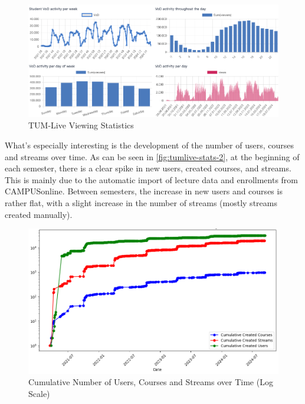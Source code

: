 \begin{figure}[htpb]
    \centering
    \includegraphics[width=\linewidth]{images/TUMLiveStatsNew.png}
    \caption[TUM-Live Statistics]{TUM-Live Viewing Statistics}\label{fig:tumlive-stats}
\end{figure}

What's especially interesting is the development of the number of users, courses and streams over time. As can be seen in \autoref{fig:tumlive-stats-2}, at the beginning of each semester, there is a clear spike in new users, created courses, and streams. This is mainly due to the automatic import of lecture data and enrollments from CAMPUSonline. Between semesters, the increase in new users and courses is rather flat, with a slight increase in the number of streams (mostly streams created manually).  

\begin{figure}[htpb]
    \centering
    \includegraphics[width=\linewidth]{images/TUMLiveStats2.png}
    \caption[Cumulative Number of Users, Courses and Streams over Time (Log Scale)]{Cumulative Number of Users, Courses and Streams over Time (Log Scale)}\label{fig:tumlive-stats-2}
\end{figure}
